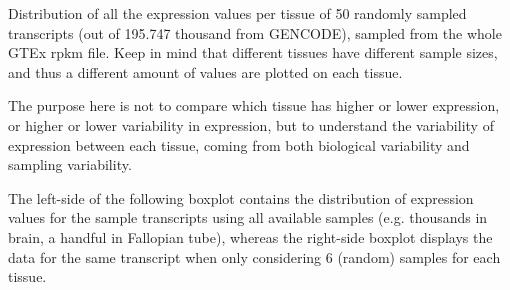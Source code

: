 \documentclass{article}\usepackage[]{graphicx}\usepackage[]{color}
\begin{document}
Distribution of all the expression values per tissue of 50 randomly sampled transcripts (out of 195.747 thousand from GENCODE), sampled from the whole GTEx rpkm file. Keep in mind that different tissues have different sample sizes, and thus a different amount of values are plotted on each tissue. \par 
The purpose here is not to compare which tissue has higher or lower expression, or higher or lower variability in expression, but to understand the variability of expression between each tissue, coming from both biological variability and sampling variability. \par
The left-side of the following boxplot contains the distribution of expression values for the sample transcripts using all available samples (e.g. thousands in brain, a handful in Fallopian tube), whereas the right-side boxplot displays the data for the same transcript when only considering 6 (random) samples for each tissue.
\end{document}
